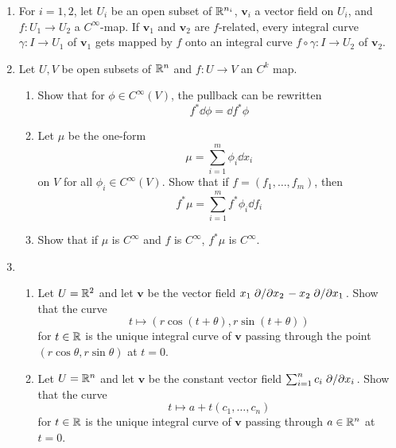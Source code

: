 \documentclass[../psets.tex]{subfiles}
\begin{document}
\begin{enumerate}[label={\textbf{2.2.\roman*.}}]
    \item For $i=1,2$, let $U_i$ be an open subset of $\mathbb{R}^{n_i}$, $\bm{v}_i$ a vector field on $U_i$, and $f:U_1\to U_2$ a $C^\infty$-map. If $\bm{v}_1$ and $\bm{v}_2$ are $f$-related, every integral curve $\gamma:I\to U_1$ of $\bm{v}_1$ gets mapped by $f$ onto an integral curve $f\circ\gamma:I\to U_2$ of $\bm{v}_2$.
    \item Let $U,V$ be open subsets of $\mathbb{R}^n$ and $f:U\to V$ an $C^k$ map.
    \begin{enumerate}
        \item Show that for $\phi\in C^\infty(V)$, the pullback can be rewritten
        \begin{equation*}
            f^*\dd{\phi} = \dd{f^*\phi}
        \end{equation*}
        \item Let $\mu$ be the one-form
        \begin{equation*}
            \mu = \sum_{i=1}^m\phi_i\dd{x_i}
        \end{equation*}
        on $V$ for all $\phi_i\in C^\infty(V)$. Show that if $f=(f_1,\dots,f_m)$, then
        \begin{equation*}
            f^*\mu = \sum_{i=1}^mf^*\phi_i\dd{f_i}
        \end{equation*}
        \item Show that if $\mu$ is $C^\infty$ and $f$ is $C^\infty$, $f^*\mu$ is $C^\infty$.
    \end{enumerate}
    \item 
    \begin{enumerate}
        \item Let $U=\mathbb{R}^2$ and let $\bm{v}$ be the vector field $x_1\pdv*{x_2}-x_2\pdv*{x_1}$. Show that the curve
        \begin{equation*}
            t \mapsto (r\cos(t+\theta),r\sin(t+\theta))
        \end{equation*}
        for $t\in\mathbb{R}$ is the unique integral curve of $\bm{v}$ passing through the point $(r\cos\theta,r\sin\theta)$ at $t=0$.
        \item Let $U=\mathbb{R}^n$ and let $\bm{v}$ be the constant vector field $\sum_{i=1}^nc_i\pdv*{x_i}$. Show that the curve
        \begin{equation*}
            t \mapsto a+t(c_1,\dots,c_n)
        \end{equation*}
        for $t\in\mathbb{R}$ is the unique integral curve of $\bm{v}$ passing through $a\in\mathbb{R}^n$ at $t=0$.

\end{enumerate}
\end{enumerate}
\end{document}

